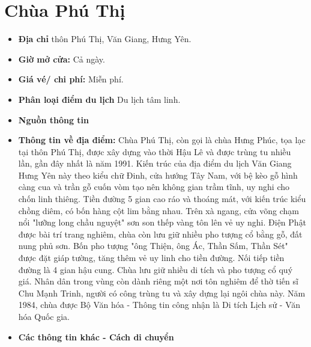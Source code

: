 \documentclass{article}
\begin{document}
\section{Chùa Phú Thị}
\begin{itemize}
    \item{\textbf{Địa chỉ}} thôn Phú Thị, Văn Giang, Hưng Yên.

    \item{\textbf{Giờ mở cửa:}} Cả ngày.

    \item{\textbf{Giá vé/ chi phí:}} Miễn phí.

    \item{\textbf{Phân loại điểm du lịch}} Du lịch tâm linh.

    \item{\textbf{Nguồn thông tin}} 

    \item{\textbf{Thông tin về địa điểm:}} Chùa Phú Thị, còn gọi là chùa Hưng Phúc, tọa lạc tại thôn Phú Thị, được xây dựng vào thời Hậu Lê và được trùng tu nhiều lần, gần đây nhất là năm 1991. Kiến trúc của địa điểm du lịch Văn Giang Hưng Yên này theo kiểu chữ Đinh, cửa hướng Tây Nam, với bệ kèo gỗ hình càng cua và trần gỗ cuốn vòm tạo nên không gian trầm tĩnh, uy nghi cho chốn linh thiêng. Tiền đường 5 gian cao ráo và thoáng mát, với kiến trúc kiểu chồng diêm, có bốn hàng cột lim bằng nhau. Trên xà ngang, cửa võng chạm nổi "lưỡng long chầu nguyệt" sơn son thếp vàng tôn lên vẻ uy nghi. Điện Phật được bài trí trang nghiêm, chùa còn lưu giữ nhiều pho tượng cổ bằng gỗ, đất nung phủ sơn. Bốn pho tượng "ông Thiện, ông Ác, Thần Sấm, Thần Sét" được đặt giáp tường, tăng thêm vẻ uy linh cho tiền đường. Nối tiếp tiền đường là 4 gian hậu cung. Chùa lưu giữ nhiều di tích và pho tượng cổ quý giá. Nhân dân trong vùng còn dành riêng một nơi tôn nghiêm để thờ tiến sĩ Chu Mạnh Trinh, người có công trùng tu và xây dựng lại ngôi chùa này. Năm 1984, chùa được Bộ Văn hóa - Thông tin công nhận là Di tích Lịch sử - Văn hóa Quốc gia.
\end{itemize}

\begin{itemize}
    \item{\textbf{Các thông tin khác - Cách di chuyển}} 
\end{itemize}
\end{document}
